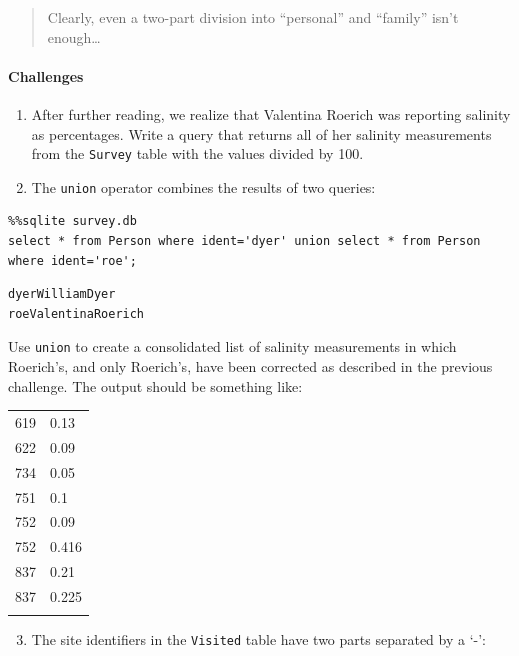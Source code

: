 \documentclass[]{book}
\begin{document}
\begin{quote}
Clearly, even a two-part division into ``personal'' and ``family'' isn't
enough\ldots{}
\end{quote}

\mbox{}\paragraph{Challenges}

\begin{enumerate}
\item
  After further reading, we realize that Valentina Roerich was reporting
  salinity as percentages. Write a query that returns all of her
  salinity measurements from the \texttt{Survey} table with the values
  divided by 100.
\item
  The \texttt{union} operator combines the results of two queries:
\end{enumerate}

\begin{verbatim}
%%sqlite survey.db
select * from Person where ident='dyer' union select * from Person where ident='roe';
\end{verbatim}

\begin{verbatim}
dyerWilliamDyer
roeValentinaRoerich
\end{verbatim}

Use \texttt{union} to create a consolidated list of salinity
measurements in which Roerich's, and only Roerich's, have been corrected
as described in the previous challenge. The output should be something
like:

\begin{longtable}[c]{@{}ll@{}}
\hline\noalign{\medskip}
619 & 0.13
\\\noalign{\medskip}
622 & 0.09
\\\noalign{\medskip}
734 & 0.05
\\\noalign{\medskip}
751 & 0.1
\\\noalign{\medskip}
752 & 0.09
\\\noalign{\medskip}
752 & 0.416
\\\noalign{\medskip}
837 & 0.21
\\\noalign{\medskip}
837 & 0.225
\\\noalign{\medskip}
\hline
\end{longtable}

\begin{enumerate}
\setcounter{enumi}{2}
\item
  The site identifiers in the \texttt{Visited} table have two parts
  separated by a `-':
\end{enumerate}
\end{document}
